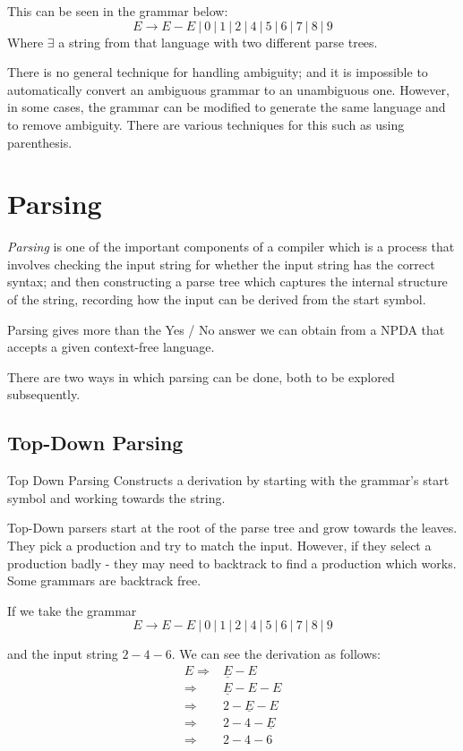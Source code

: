 This can be seen in the grammar below:
\[E \rightarrow E - E\ |\ 0\ |\ 1\ |\ 2\ |\ 4\ |\ 5\ |\ 6\ |\ 7\ |\ 8\ |\ 9\]
Where $\exists$ a string from that language with two different parse trees. 

There is no general technique for handling ambiguity; and it is impossible to automatically convert an ambiguous grammar to an unambiguous one. However, in some cases, the grammar can be modified to generate the same language and to remove ambiguity. There are various techniques for this such as using parenthesis. 

\section{Parsing}
\textit{Parsing} is one of the important components of a compiler which is a process that involves checking the input string for whether the input string has the correct syntax; and then constructing a parse tree which captures the internal structure of the string, recording how the input can be derived from the start symbol. 

Parsing gives more than the Yes / No answer we can obtain from a NPDA that accepts a given context-free language. 

There are two ways in which parsing can be done, both to be explored subsequently. 

\subsection{Top-Down Parsing}
\begin{define}
\item[Top Down Parsing] Constructs a derivation by starting with the grammar's start symbol and working towards the string.
\end{define}

Top-Down parsers start at the root of the parse tree and grow towards the leaves. They pick a production and try to match the input. However, if they select a production badly - they may need to backtrack to find a production which works. Some grammars are backtrack free. 

If we take the grammar
\[E \rightarrow E - E\ |\ 0\ |\ 1\ |\ 2\ |\ 4\ |\ 5\ |\ 6\ |\ 7\ |\ 8\ |\ 9\]

and the input string $2-4-6$. We can see the derivation as follows:
\begin{align*}
E \Rightarrow & \underline{E} - E\\
\Rightarrow & \underline{E} - E - E\\
\Rightarrow & 2 - \underline{E} - E\\
\Rightarrow & 2 - 4 - \underline{E}\\
\Rightarrow & 2 - 4 - 6
\end{align*}


